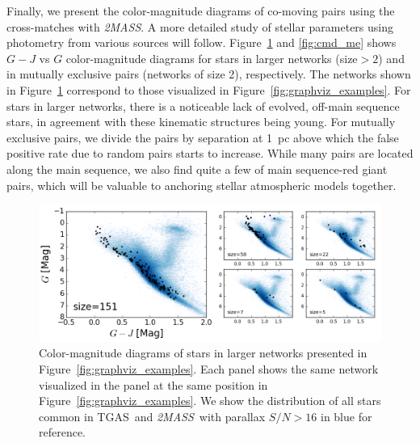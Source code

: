 \documentclass[manuscript, letterpaper]{aastex6}
\newcommand{\project}[1]{\textsl{#1}}
\newcommand{\acronym}[1]{{\small{#1}}}
\newcommand{\tmass}{\project{\acronym{2MASS}}}
\newcommand{\tgas}{\acronym{TGAS}}
\begin{document}
Finally, we present the color-magnitude diagrams of co-moving pairs
using the cross-matches with \tmass.
A more detailed study of stellar parameters using photometry from various sources
will follow. Figure~\ref{fig:cmd_large} and \ref{fig:cmd_me} shows $G-J$ vs $G$
color-magnitude diagrams for stars in larger networks (size$>2$) and in mutually
exclusive pairs (networks of size 2), respectively.
The networks shown in Figure~\ref{fig:cmd_large} correspond to those visualized
in Figure~\ref{fig:graphviz_examples}.
For stars in larger networks, there is a noticeable lack of evolved, off-main sequence
stars, in agreement with these kinematic structures being young.
For mutually exclusive pairs, we divide the pairs by separation at 1~pc
above which the false positive rate due to random pairs starts to increase.
While many pairs are located along the main sequence, we also find
quite a few of main sequence-red giant pairs,
which will be valuable to anchoring stellar atmospheric models together.

\begin{figure}[htbp]
  \begin{center}
    \includegraphics[width=\textwidth]{figures/gjg_graphviz_examples.png}
  \end{center}
  \caption{
    Color-magnitude diagrams of stars in larger networks presented in
    Figure~\ref{fig:graphviz_examples}. Each panel shows the same network
    visualized in the panel at the same position
    in Figure~\ref{fig:graphviz_examples}.
    We show the distribution of all stars common in \tgas\ and \tmass\
    with parallax $S/N>16$ in blue for reference.
    \label{fig:cmd_large}}
\end{figure}
\end{document}
